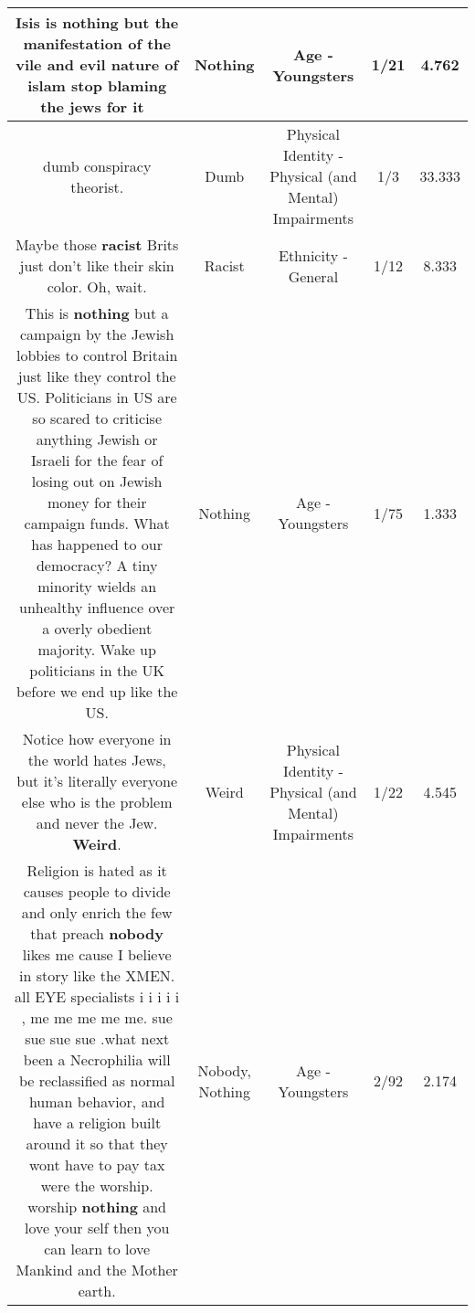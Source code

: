 \documentclass[11pt]{article}
\newlength\mylength
\begin{document}
\begin{center}
\begin{longtable}{|C{.65\mylength}|C{.30\mylength}|C{.12\mylength}|C{.12\mylength}|C{.12\mylength}|}
  \small Isis is \textbf{nothing} but the  manifestation of the vile and evil nature of islam stop blaming the jews for it 🤣\normalsize   & Nothing & Age - Youngsters & 1/21 & 4.762 \\  \hline
  \small dumb conspiracy theorist.\normalsize   & Dumb & Physical Identity - Physical (and Mental) Impairments & 1/3 & 33.333 \\  \hline
  \small Maybe those \textbf{racist} Brits just don't like their skin color.  Oh, wait.\normalsize   & Racist & Ethnicity - General & 1/12 & 8.333 \\  \hline
  \small This is \textbf{nothing} but a campaign by the Jewish lobbies to control Britain just like they control the US. Politicians in US are so scared to criticise anything Jewish or Israeli for the fear of losing out on Jewish money for their campaign funds. What has happened to our democracy? A tiny minority wields an unhealthy influence over a overly obedient majority. Wake up politicians in the UK before we end up like the US.\normalsize   & Nothing & Age - Youngsters & 1/75 & 1.333 \\  \hline
  \small Notice how everyone in the world hates Jews, but it's literally everyone else who is the problem and never the Jew. \textbf{Weird}.\normalsize   & Weird & Physical Identity - Physical (and Mental) Impairments & 1/22 & 4.545 \\  \hline
  \small Religion is hated as it causes people to divide and only enrich the few that preach \textbf{nobody} likes me cause I believe in story like the XMEN. all EYE specialists i i i i i , me me me me me. sue sue sue sue .what  next been a Necrophilia will be reclassified as normal human behavior, and have a religion built around it  so that they wont have to pay tax were the worship. worship \textbf{nothing} and love your self then you can learn to love Mankind and the Mother earth.\normalsize   & Nobody, Nothing & Age - Youngsters & 2/92 & 2.174 \\  \hline

\end{longtable}
\end{center}
\end{document}

